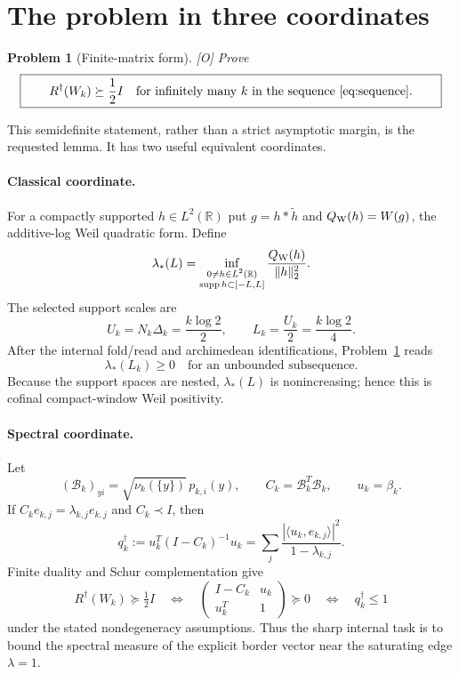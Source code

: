 \documentclass[11pt]{article}
\newtheorem{problem}{Problem}
\newcommand{\R}{\mathbb R}
\newcommand{\Rd}{R^{\dagger}}
\newcommand{\half}{\tfrac12}
\newcommand{\Ograde}{\textnormal{\small[O]}}
\begin{document}
\section{The problem in three coordinates}

\begin{problem}[Finite-matrix form]\label{prob:main}
\Ograde{} Prove
\[
\boxed{\qquad
\Rd(W_k)\succeq\frac12 I
\quad\text{for infinitely many }k
\text{ in the sequence \eqref{eq:sequence}.}\qquad}
\]
\end{problem}

This semidefinite statement, rather than a strict asymptotic margin,
is the requested lemma.  It has two useful equivalent coordinates.

\paragraph{Classical coordinate.}
For a compactly supported $h\in L^2(\R)$ put
$g=h*\widetilde h$ and $Q_{\rm W}(h)=W(g)$, the additive-log Weil
quadratic form.  Define
\[
 \lambda_*(L)=
 \inf_{\substack{0\ne h\in L^2(\R)\\
 \operatorname{supp}h\subset[-L,L]}}
 \frac{Q_{\rm W}(h)}{\|h\|_2^2}.
\]
The selected support scales are
\begin{equation}\label{eq:support}
 U_k=N_k\Delta_k=\frac{k\log2}{2},\qquad
 L_k=\frac{U_k}{2}=\frac{k\log2}{4}.
\end{equation}
After the internal fold/read and archimedean identifications,
Problem~\ref{prob:main} reads
\[
 \lambda_*(L_k)\ge0
 \quad\text{for an unbounded subsequence.}
\]
Because the support spaces are nested, $\lambda_*(L)$ is
nonincreasing; hence this is cofinal compact-window Weil positivity.

\paragraph{Spectral coordinate.}
Let
\[
 (\mathcal B_k)_{y i}=\sqrt{\nu_k(\{y\})}\,p_{k,i}(y),\qquad
 C_k=\mathcal B_k^T\mathcal B_k,\qquad u_k=\beta_k .
\]
If $C_ke_{k,j}=\lambda_{k,j}e_{k,j}$ and $C_k\prec I$, then
\begin{equation}\label{eq:spectral}
 q_k^\dagger
 :=u_k^T(I-C_k)^{-1}u_k
 =\sum_j\frac{|\langle u_k,e_{k,j}\rangle|^2}
                 {1-\lambda_{k,j}}.
\end{equation}
Finite duality and Schur complementation give
\begin{equation}\label{eq:three-way}
 \Rd(W_k)\succeq\half I
 \quad\Longleftrightarrow\quad
 \begin{pmatrix}I-C_k&u_k\\u_k^T&1\end{pmatrix}\succeq0
 \quad\Longleftrightarrow\quad q_k^\dagger\le1
\end{equation}
under the stated nondegeneracy assumptions.  Thus the sharp internal
task is to bound the spectral measure of the explicit border vector
near the saturating edge $\lambda=1$.
\end{document}
